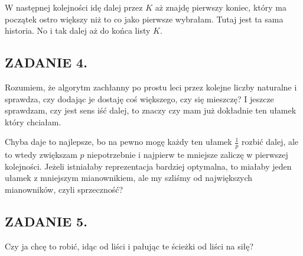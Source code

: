 \documentclass{article}
\begin{document}
W następnej kolejności idę dalej przez $K$ aż znajdę pierwszy koniec, który ma początek ostro większy niż to co jako pierwsze wybrałam. Tutaj jest ta sama historia. No i tak dalej aż do końca listy $K$.


\subsection*{ZADANIE 4.}

Rozumiem, że algorytm zachłanny po prostu leci przez kolejne liczby naturalne i sprawdza, czy dodając je dostaję coś większego, czy się mieszczę? I jeszcze sprawdzam, czy jest sens iść dalej, to znaczy czy mam już dokładnie ten ułamek który chciałam.

Chyba daje to najlepsze, bo na pewno mogę każdy ten ułamek $\frac1p$ rozbić dalej, ale to wtedy zwiększam $p$ niepotrzebnie i najpierw te mniejsze zaliczę w pierwszej kolejności. Jeżeli istniałaby reprezentacja bardziej optymalna, to miałaby jeden ułamek z mniejszym mianownikiem, ale my szliśmy od największych mianowników, czyli sprzeczność?

\subsection*{ZADANIE 5.}

Czy ja chcę to robić, idąc od liści i pałując te ścieżki od liści na siłę?
\end{document}
